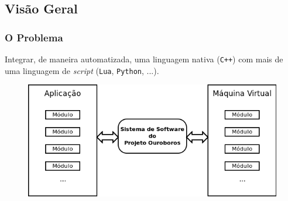 \documentclass[brazil]{beamer}
\begin{document}
\subsection{Visão Geral}
\begin{frame}[fragile]
  \frametitle{O Problema}
  \pause
  \begin{block}{}
    Integrar, de maneira automatizada, uma linguagem nativa (\texttt{C++}) com
    mais de uma linguagem de \textit{script} (\texttt{Lua}, \texttt{Python}, ...).
  \end{block}
  \pause
  \begin{figure}
    \includegraphics[width=.7\textwidth]{images/overview-simple.png}
  \end{figure}
\end{frame}
\end{document}
